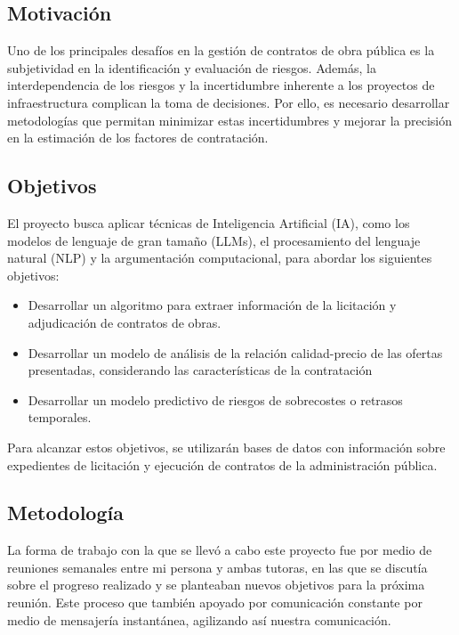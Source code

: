 \documentclass{article}
\begin{document}
\subsection{Motivación}
Uno de los principales desafíos en la gestión de contratos de obra pública es la subjetividad en la identificación y evaluación de riesgos. Además, la interdependencia de los riesgos y la incertidumbre inherente a los proyectos de infraestructura complican la toma de decisiones. Por ello, es necesario desarrollar metodologías que permitan minimizar estas incertidumbres y mejorar la precisión en la estimación de los factores de contratación.

\subsection{Objetivos}
El proyecto busca aplicar técnicas de Inteligencia Artificial (IA), como los modelos de lenguaje de gran tamaño (LLMs), el procesamiento del lenguaje natural (NLP) y la argumentación computacional, para abordar los siguientes objetivos:
\begin{itemize}
  \item Desarrollar un algoritmo para extraer información de la licitación y adjudicación de contratos de obras.
  \item Desarrollar un modelo de análisis de la relación calidad-precio de las ofertas presentadas, considerando las características de la contratación
  \item Desarrollar un modelo predictivo de riesgos de sobrecostes o retrasos temporales.
\end{itemize}
Para alcanzar estos objetivos, se utilizarán bases de datos con información sobre expedientes de licitación y ejecución de contratos de la administración pública.

\subsection{Metodología}
La forma de trabajo con la que se llevó a cabo este proyecto fue por medio de reuniones semanales entre mi persona y ambas tutoras, en las que se discutía sobre el progreso realizado y se planteaban nuevos objetivos para la próxima reunión. Este proceso que también apoyado por comunicación constante por medio de mensajería instantánea, agilizando así nuestra comunicación. 
\newpage
\end{document}
